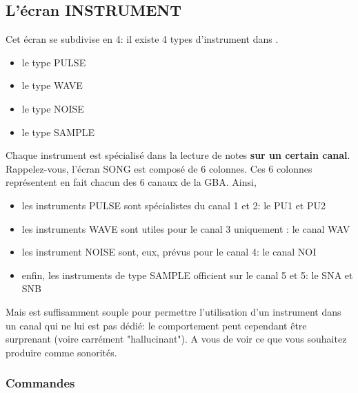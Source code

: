 \documentclass[12pt,a4paper]{article}
\begin{document}
    \subsection{L'écran INSTRUMENT}
    
    Cet écran se subdivise en 4: il existe 4 types d'instrument dans \FAT.\medskip
    
    \begin{itemize}
        \item{le type PULSE}
        \item{le type WAVE}
        \item{le type NOISE}
        \item{le type SAMPLE}
    \end{itemize}\medskip
    
     
     Chaque instrument est spécialisé dans la lecture de notes {\bf sur un certain canal}. Rappelez-vous, l'écran SONG est composé de 6 colonnes. Ces 6 colonnes représentent en fait chacun des 6 canaux de la GBA. Ainsi, 
     
     \begin{itemize}
        \item{les instruments PULSE sont spécialistes du canal 1 et 2: le PU1 et PU2}
        \item{les instruments WAVE sont utiles pour le canal 3 uniquement : le canal WAV}
        \item{les instrument NOISE sont, eux, prévus pour le canal 4: le canal NOI}
        \item{enfin, les instruments de type SAMPLE officient sur le canal 5 et 5: le SNA et SNB}
     \end{itemize}\medskip
     
     Mais \FAT est suffisamment souple pour permettre l'utilisation d'un instrument dans un canal qui ne lui est pas dédié: le comportement peut cependant être surprenant (voire carrément "hallucinant"). A vous de voir ce que vous souhaitez produire comme sonorités.

        \subsubsection{Commandes}
        
\end{document}
